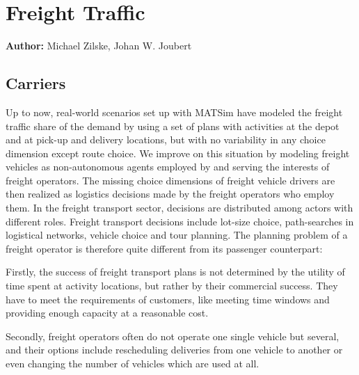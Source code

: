 \chapter{Freight Traffic}
\label{ch:freight}

\hfill \textbf{Author:} Michael Zilske, Johan W. Joubert



\section{Carriers}
\label{sec:carriers}

Up to now, real-world scenarios set up with MATSim have modeled the freight traffic share of
the demand by using a set of plans with activities at the depot and at pick-up and delivery
locations, but with no variability in any choice dimension except route choice. We improve on
this situation by modeling freight vehicles as non-autonomous agents employed by and serving
the interests of freight operators. The missing choice dimensions of freight vehicle drivers are
then realized as logistics decisions made by the freight operators who employ them. In the
freight transport sector, decisions are distributed among actors with different roles. Freight
transport decisions include lot-size choice, path-searches in logistical networks, vehicle choice
and tour planning. The planning problem of a freight operator is therefore quite different from
its passenger counterpart:

Firstly, the success of freight transport plans is not determined by the utility of time
spent at activity locations, but rather by their commercial success. They have to meet the
requirements of customers, like meeting time windows and providing enough capacity at
a reasonable cost.

Secondly, freight operators often do not operate one single vehicle but several, and their
options include rescheduling deliveries from one vehicle to another or even changing the
number of vehicles which are used at all.

